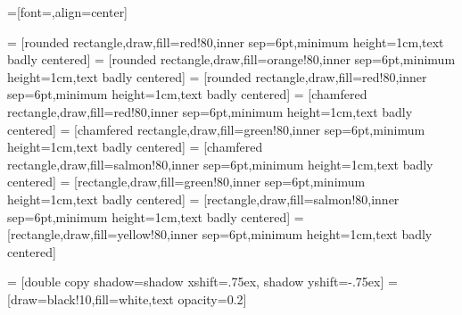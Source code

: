 

=[font=\sffamily,align=center]

\newcommand{\fillOpacity}{80}%

\newcommand{\compShape}{rectangle}%
\newcommand{\groupShape}{chamfered rectangle}%
\newcommand{\procShape}{rounded rectangle}%

\newcommand{\explicitColor}{green}%
\newcommand{\implicitColor}{salmon}%
\newcommand{\optimizationColor}{red}%

 = [\procShape,draw,fill=\optimizationColor!\fillOpacity,inner sep=6pt,minimum height=1cm,text badly centered]
 = [\procShape,draw,fill=orange!\fillOpacity,inner sep=6pt,minimum height=1cm,text badly centered]
 = [\procShape,draw,fill=\optimizationColor!\fillOpacity,inner sep=6pt,minimum height=1cm,text badly centered]
 = [\groupShape,draw,fill=\optimizationColor!\fillOpacity,inner sep=6pt,minimum height=1cm,text badly centered]
 = [\groupShape,draw,fill=\explicitColor!\fillOpacity,inner sep=6pt,minimum height=1cm,text badly centered]
 = [\groupShape,draw,fill=\implicitColor!\fillOpacity,inner sep=6pt,minimum height=1cm,text badly centered]
 = [\compShape,draw,fill=\explicitColor!\fillOpacity,inner sep=6pt,minimum height=1cm,text badly centered]
 = [\compShape,draw,fill=\implicitColor!\fillOpacity,inner sep=6pt,minimum height=1cm,text badly centered]
 = [\compShape,draw,fill=yellow!\fillOpacity,inner sep=6pt,minimum height=1cm,text badly centered]

 = [double copy shadow={shadow xshift=.75ex, shadow yshift=-.75ex}]
 = [draw=black!10,fill=white,text opacity=0.2]

